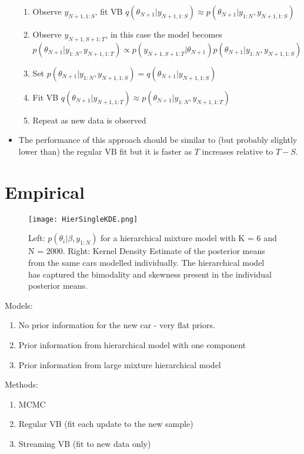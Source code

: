 \documentclass[12pt,a4paper]{article}\usepackage[]{graphicx}\usepackage[]{color}
\begin{document}
\begin{itemize}
\begin{enumerate}
\item Observe $y_{N+1, 1:S}$, fit VB $q(\theta_{N+1} | y_{N+1, 1:S}) \approx p(\theta_{N+1} | y_{1:N}, y_{N+1, 1:S})$
\item Observe $y_{N+1, S+1:T}$, in this case the model becomes
\begin{equation}
p(\theta_{N+1} | y_{1:N}, y_{N+1, 1:T}) \propto p(y_{N+1, S+1:T} | \theta_{N+1})p(\theta_{N+1} |  y_{1:N}, y_{N+1, 1:S})
\end{equation}
\item Set $p(\theta_{N+1} |  y_{1:N}, y_{N+1, 1:S}) = q(\theta_{N+1} | y_{N+1, 1:S})$
\item Fit VB  $q(\theta_{N+1} | y_{N+1, 1:T}) \approx p(\theta_{N+1} | y_{1:N}, y_{N+1, 1:T})$
\item Repeat as new data is observed
\end{enumerate}
\item The performance of this approach should be similar to (but probably slightly lower than) the regular VB fit but it is faster as $T$ increases relative to $T - S$.
\end{itemize}

\section{Empirical}

\begin{figure}[h]
\centering
\texttt{[image: HierSingleKDE.png]}
\caption{Left: $p(\theta_i | \beta, y_{1:N})$ for a hierarchical mixture model with K = 6 and N = 2000. Right: Kernel Density Estimate of the posterior means from the same cars modelled individually. The hierarchical model has captured the bimodality and skewness present in the individual posterior means.}
\label{fig:HierSingleKDE}
\end{figure}

Models:
\begin{enumerate}
\item No prior information for the new car - very flat priors.
\item Prior information from hierarchical model with one component
\item Prior information from large mixture hierarchical model
\end{enumerate}

Methods:
\begin{enumerate}
\item MCMC
\item Regular VB (fit each update to the new sample)
\item Streaming VB (fit to new data only)
\end{enumerate}
\end{document}

